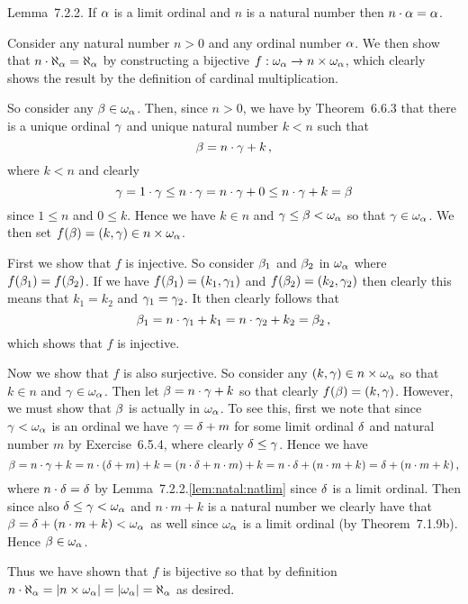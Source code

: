 \def\ex{7.2.2}
\setcounter{itm}{0}
\question{\ex}
\begin{solution}
    \begin{statement}{Lemma~\ex.}
        If $\alpha$ is a limit ordinal and $n$ is a natural number then $n \cdot \alpha = \alpha$.
    \end{statement}

    \mainprob

    Consider any natural number $n > 0$ and any ordinal number $\alpha$.
    We then show that $n \cdot \aleph_\alpha = \aleph_\alpha$ by constructing a bijective $f: \omega_\alpha \to n \times \omega_\alpha$, which clearly shows the result by the definition of cardinal multiplication.

    So consider any $\beta \in \omega_\alpha$.
    Then, since $n > 0$, we have by Theorem~6.6.3 that there is a unique ordinal $\gamma$ and unique natural number $k < n$ such that
    $$
    \beta = n \cdot \gamma + k \,,
    $$
    where $k < n$ and clearly
    $$
    \gamma = 1 \cdot \gamma \leq n \cdot \gamma = n \cdot \gamma + 0 \leq n \cdot \gamma + k = \beta
    $$
    since $1 \leq n$ and $0 \leq k$.
    Hence we have $k \in n$ and $\gamma \leq \beta < \omega_\alpha$ so that $\gamma \in \omega_\alpha$.
    We then set $f(\beta) = (k, \gamma) \in n \times \omega_\alpha$.

    First we show that $f$ is injective.
    So consider $\beta_1$ and $\beta_2$ in $\omega_\alpha$ where $f(\beta_1) = f(\beta_2)$.
    If we have $f(\beta_1) = (k_1, \gamma_1)$ and $f(\beta_2) = (k_2, \gamma_2)$ then clearly this means that $k_1 = k_2$ and $\gamma_1 = \gamma_2$.
    It then clearly follows that
    $$
    \beta_1 = n \cdot \gamma_1 + k_1 = n \cdot \gamma_2 + k_2 = \beta_2 \,,
    $$
    which shows that $f$ is injective.

    Now we show that $f$ is also surjective.
    So consider any $(k, \gamma) \in n \times \omega_\alpha$ so that $k \in n$ and $\gamma \in \omega_\alpha$.
    Then let $\beta = n \cdot \gamma + k$ so that clearly $f(\beta) = (k, \gamma)$.
    However, we must show that $\beta$ is actually in $\omega_\alpha$.
    To see this, first we note that since $\gamma < \omega_\alpha$ is an ordinal we have $\gamma = \delta + m$ for some limit ordinal $\delta$ and natural number $m$ by Exercise~6.5.4, where clearly $\delta \leq \gamma$.
    Hence we have
    $$
    \beta = n \cdot \gamma + k = n \cdot (\delta + m) + k = (n \cdot \delta + n \cdot m) + k = n \cdot \delta + (n \cdot m + k) = \delta + (n \cdot m + k) \,,
    $$
    where $n \cdot \delta = \delta$ by Lemma~\ex.\ref{lem:natal:natlim} since $\delta$ is a limit ordinal.
    Then since also $\delta \leq \gamma < \omega_\alpha$ and $n \cdot m + k$ is a natural number we clearly have that $\beta = \delta + (n \cdot m + k)< \omega_\alpha$ as well since $\omega_\alpha$ is a limit ordinal (by Theorem~7.1.9b).
    Hence $\beta \in \omega_\alpha$.

    Thus we have shown that $f$ is bijective so that by definition $n \cdot \aleph_\alpha = \left| n \times \omega_\alpha \right| = \left| \omega_\alpha \right| = \aleph_\alpha$ as desired. \qedsymbol
\end{solution}

